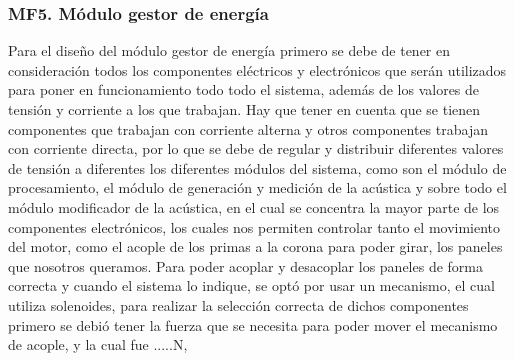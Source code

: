\subsubsection{MF5. Módulo gestor de energía}

Para el diseño del módulo gestor de energía primero se debe de tener en consideración todos los componentes eléctricos y electrónicos que serán utilizados para poner en funcionamiento todo todo el sistema, además de los valores de tensión y corriente a los que trabajan. Hay que tener en cuenta que se tienen componentes que trabajan con corriente alterna y otros componentes trabajan con corriente directa, por lo que se debe de regular y distribuir diferentes valores de tensión a diferentes los diferentes módulos del sistema, como son el módulo de procesamiento, el módulo de generación y medición de la acústica y sobre todo el módulo modificador de la acústica, en el cual se concentra la mayor parte de los componentes electrónicos, los cuales nos permiten controlar tanto el movimiento del motor, como el acople de los primas a la corona para poder girar, los paneles que nosotros queramos.
Para poder acoplar y desacoplar los paneles de forma correcta y cuando el sistema lo indique, se optó por usar un mecanismo, el cual utiliza solenoides, para realizar la selección correcta de dichos componentes primero se debió tener la fuerza que se necesita para poder mover el mecanismo de acople, y la cual fue .....N,

